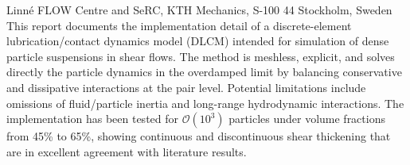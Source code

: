 %
%
%
%
%
%
%
\paperaffiliation
{%
  Linn\'e FLOW Centre and SeRC, KTH Mechanics, S-100 44 Stockholm, Sweden%
}%
%
%
%
\papervolume{}%
%
\papernumber{}
%
\paperpages{}%
%
\paperyear{}%
%
\papersummary%
{%
   This report documents the implementation detail of a discrete-element lubrication/contact dynamics model (DLCM) intended for simulation of dense particle suspensions in shear flows. The method is meshless, explicit, and solves directly the particle dynamics in the overdamped limit by balancing conservative and dissipative interactions at the pair level. Potential limitations include omissions of fluid/particle inertia and long-range hydrodynamic interactions. The implementation has been tested for $\mathcal{O}(10^3)$ particles under volume fractions from 45\% to 65\%, showing continuous and discontinuous shear thickening that are in excellent agreement with literature results.
}%
%
\graphicspath{{paper7/}}%
%
%
%
